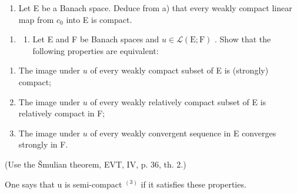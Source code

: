 \begin{enumerate}
\def\labelenumi{\alph{enumi})}
\setcounter{enumi}{1}
\tightlist
\item
  Let E be a Banach space. Deduce from a) that every weakly compact linear map from \(c_{0}\) into E is compact.
\end{enumerate}

\begin{enumerate}
\def\labelenumi{\arabic{enumi})}
\setcounter{enumi}{29}
\tightlist
\item
  \begin{enumerate}
  \def\labelenumii{\alph{enumii})}
  \tightlist
  \item
    Let E and F be Banach spaces and \(u \in \mathcal{L}(\mathrm{E};\mathrm{F})\) . Show that the following properties are equivalent:
  \end{enumerate}
\end{enumerate}

\begin{enumerate}
\def\labelenumi{(\roman{enumi})}
\item
  The image under \(u\) of every weakly compact subset of E is (strongly) compact;
\item
  The image under \(u\) of every weakly relatively compact subset of E is relatively compact in F;
\item
  The image under \(u\) of every weakly convergent sequence in E converges strongly in F.
\end{enumerate}

(Use the Šmulian theorem, EVT, IV, p. 36, th. 2.)

One says that u is semi-compact \(^{(3)}\) if it satisfies these properties.

